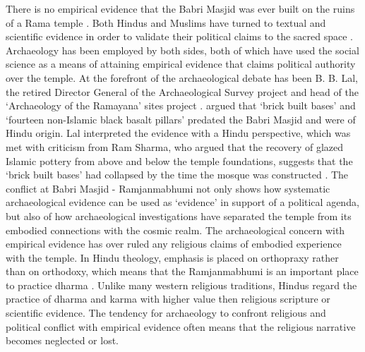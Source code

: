 	 There is no empirical evidence that the Babri Masjid was ever built on the ruins of a Rama temple \parencite [122] {Bhattacharya_1991}. Both Hindus and Muslims have turned to textual and scientific evidence in order to validate their political claims to the sacred space \parencite [156] {Rao_1994}. Archaeology has been employed by both sides, both of which have used the social science as a means of attaining empirical evidence that claims political authority over the temple. At the forefront of the archaeological debate has been B. B. Lal, the retired Director General of the Archaeological Survey project and head of the ‘Archaeology of the Ramayana’ sites project \parencite [148] {Barber_2006}. \textcite [119-123] {Lal_2001} argued that ‘brick built bases’ and ‘fourteen non-Islamic black basalt pillars’ predated the Babri Masjid and were of Hindu origin. Lal interpreted the evidence with a Hindu perspective, which was met with criticism from Ram Sharma, who argued that the recovery of glazed Islamic pottery from above and below the temple foundations, suggests that the ‘brick built bases’ had collapsed by the time the mosque was constructed \parencite [132-134] {Sharma_2001}. The conflict at Babri Masjid - Ramjanmabhumi not only shows how systematic archaeological evidence can be used as ‘evidence’ in support of a political agenda, but also of how archaeological investigations have separated the temple from its embodied connections with the cosmic realm. The archaeological concern with empirical evidence has over ruled any religious claims of embodied experience with the temple. In Hindu theology, emphasis is placed on orthopraxy rather than on orthodoxy, which means that the Ramjanmabhumi is an important place to practice dharma \parencite[70]{Staal_1993}. Unlike many western religious traditions, Hindus regard the practice of dharma and karma with higher value then religious scripture or scientific evidence. The tendency for archaeology to confront religious and political conflict with empirical evidence often means that the religious narrative becomes neglected or lost.
	 
